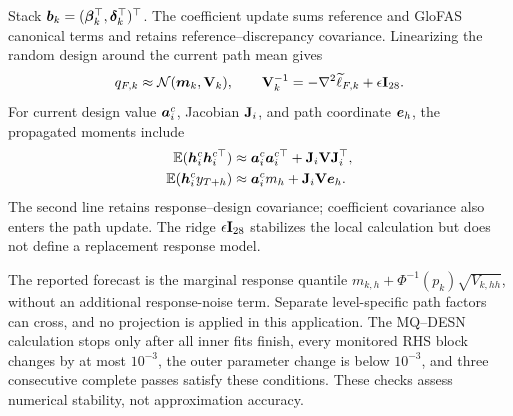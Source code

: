 Stack \(\boldsymbol{b}_k=(\boldsymbol{\beta}_k^\top,\boldsymbol{\delta}_k^\top)^\top\). The
coefficient update sums reference and GloFAS canonical terms and retains
reference--discrepancy covariance. Linearizing the random design around the
current path mean gives
\begin{equation}
q_{F,k}\approx\mathcal{N}(\boldsymbol{m}_k,\mathbf{V}_k),
\qquad
\mathbf{V}_k^{-1}=-\nabla^2\widetilde\ell_{F,k}+\epsilon\mathbf{I}_{28}.
\label{qdesn2026:eq:supp_glofas_future_path_factor}
\end{equation}
For current design value \(\boldsymbol{a}_i^c\), Jacobian \(\mathbf{J}_i\), and path
coordinate \(\boldsymbol{e}_h\), the propagated moments include
\begin{equation}
\begin{aligned}
\mathbb{E}(\boldsymbol{h}_i^c\boldsymbol{h}_i^{c\top})
&\approx\boldsymbol{a}_i^c\boldsymbol{a}_i^{c\top}+\mathbf{J}_i\mathbf{V}\mathbf{J}_i^\top,\\
\mathbb{E}(\boldsymbol{h}_i^c y_{T+h})
&\approx\boldsymbol{a}_i^c m_h+\mathbf{J}_i\mathbf{V}\boldsymbol{e}_h.
\end{aligned}
\label{qdesn2026:eq:supp_glofas_future_path_delta}
\end{equation}
The second line retains response--design covariance; coefficient covariance
also enters the path update. The ridge \(\epsilon\mathbf{I}_{28}\) stabilizes the
local calculation but does not define a replacement response model.

The reported forecast is the marginal response quantile
\(m_{k,h}+\Phi^{-1}(p_k)\sqrt{V_{k,hh}}\), without an additional response-noise
term. Separate level-specific path factors can cross, and no projection is
applied in this application. The MQ--DESN calculation stops only after all
inner fits finish, every monitored RHS block changes by at most \(10^{-3}\),
the outer parameter change is below \(10^{-3}\), and three consecutive
complete passes satisfy these conditions. These checks assess numerical
stability, not approximation accuracy.
